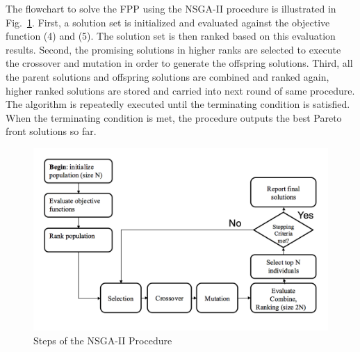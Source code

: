 \documentclass[10pt,journal,compsoc]{IEEEtran}
\newcommand{\Fig}[1]{Fig.~\ref{#1}}
\begin{document}
The flowchart to solve the FPP using the NSGA-II procedure is illustrated in \Fig{nsgaflowchart}. First, a solution set is initialized and evaluated against the objective function (4) and (5). The solution set is then ranked based on this evaluation results. Second, the promising solutions in higher ranks are selected to execute the crossover and mutation in order to generate the offspring solutions. Third, all the parent solutions and offspring solutions are combined and ranked again, higher ranked solutions are stored and carried into next round of same procedure. The algorithm is repeatedly executed until the terminating condition is satisfied. When the terminating condition is met, the procedure outputs the best Pareto front solutions so far.
\begin{figure}[ht]
\centerline{\includegraphics[width=\columnwidth]{nsgaphaseflowchart.png}}
\caption{Steps of the NSGA-II Procedure} 
\label{nsgaflowchart}
\end{figure}

\end{document}
